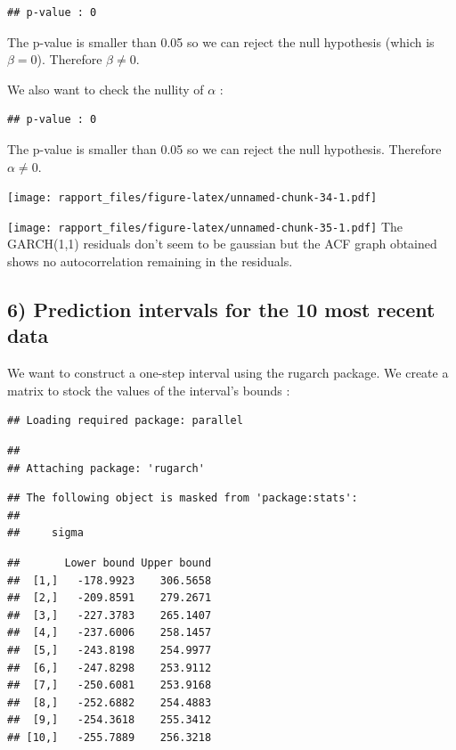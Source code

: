 \documentclass[]{article}
\begin{document}
\begin{verbatim}
## p-value : 0
\end{verbatim}

The p-value is smaller than 0.05 so we can reject the null hypothesis
(which is \(\beta=0\)). Therefore \(\beta \neq 0\).

We also want to check the nullity of \(\alpha\) :

\begin{verbatim}
## p-value : 0
\end{verbatim}

The p-value is smaller than 0.05 so we can reject the null hypothesis.
Therefore \(\alpha \neq 0\).

\texttt{[image: rapport\_files/figure-latex/unnamed-chunk-34-1.pdf]}

\texttt{[image: rapport\_files/figure-latex/unnamed-chunk-35-1.pdf]} The
GARCH(1,1) residuals don't seem to be gaussian but the ACF graph
obtained shows no autocorrelation remaining in the residuals.

\subsection{6) Prediction intervals for the 10 most recent data}

We want to construct a one-step interval using the rugarch package. We
create a matrix to stock the values of the interval's bounds :

\begin{verbatim}
## Loading required package: parallel
\end{verbatim}

\begin{verbatim}
## 
## Attaching package: 'rugarch'
\end{verbatim}

\begin{verbatim}
## The following object is masked from 'package:stats':
## 
##     sigma
\end{verbatim}

\begin{verbatim}
##       Lower bound Upper bound
##  [1,]   -178.9923    306.5658
##  [2,]   -209.8591    279.2671
##  [3,]   -227.3783    265.1407
##  [4,]   -237.6006    258.1457
##  [5,]   -243.8198    254.9977
##  [6,]   -247.8298    253.9112
##  [7,]   -250.6081    253.9168
##  [8,]   -252.6882    254.4883
##  [9,]   -254.3618    255.3412
## [10,]   -255.7889    256.3218
\end{verbatim}
\end{document}

